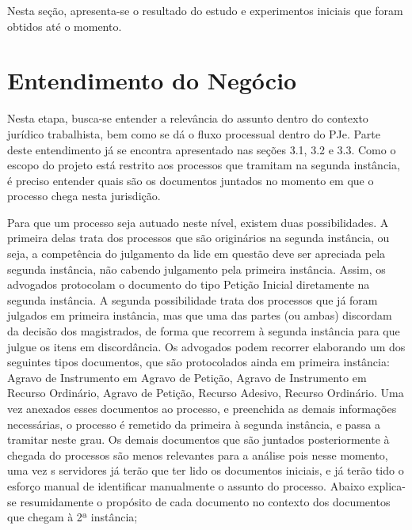 Nesta seção, apresenta-se o resultado do estudo e experimentos iniciais que foram obtidos até o momento.

\section{Entendimento do Negócio}

Nesta etapa, busca-se entender a relevância do assunto dentro do contexto jurídico trabalhista, bem como se dá o fluxo processual dentro do PJe. Parte deste entendimento já se encontra apresentado nas seções 3.1, 3.2 e 3.3. Como o escopo do projeto está restrito aos processos que tramitam na segunda instância, é preciso entender quais são os documentos juntados no momento em que o processo chega nesta jurisdição. 

Para que um processo seja autuado neste nível, existem duas possibilidades. A primeira delas trata dos processos que são originários na segunda instância, ou seja, a competência do julgamento da lide em questão deve ser apreciada pela segunda instância, não cabendo julgamento pela primeira instância. Assim, os advogados protocolam o documento do tipo Petição Inicial diretamente na segunda instância. A segunda possibilidade trata dos processos que já foram julgados em primeira instância, mas que uma das partes (ou ambas) discordam da decisão dos magistrados, de forma que recorrem à segunda instância para que julgue os itens em discordância. Os advogados podem recorrer elaborando um dos seguintes tipos documentos, que são protocolados ainda em primeira instância: Agravo de Instrumento em Agravo de Petição, Agravo de Instrumento em Recurso Ordinário, Agravo de Petição, Recurso Adesivo, Recurso Ordinário. Uma vez anexados esses documentos ao processo, e preenchida as demais informações necessárias, o processo é remetido da primeira à segunda instância, e passa a tramitar neste grau. Os demais documentos que são juntados posteriormente à chegada do processos são menos relevantes para a análise pois nesse momento, uma vez s servidores já terão que ter lido os documentos iniciais, e já terão tido o esforço manual de identificar manualmente o assunto do processo.  Abaixo explica-se resumidamente o propósito de cada documento no contexto dos documentos que chegam à 2ª instância;


